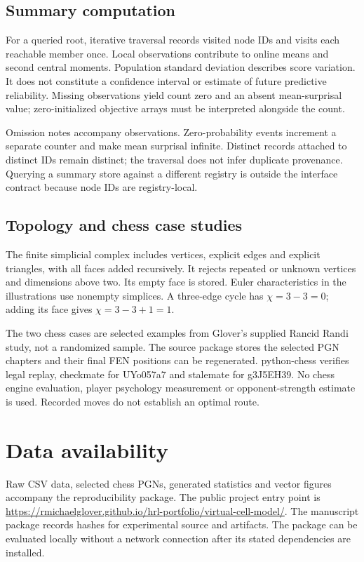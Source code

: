 \documentclass[10pt,a4paper]{article}
\begin{document}
\subsection*{Summary computation}
For a queried root, iterative traversal records visited node IDs and visits each reachable member once. Local observations contribute to online means and second central moments. Population standard deviation describes score variation. It does not constitute a confidence interval or estimate of future predictive reliability. Missing observations yield count zero and an absent mean-surprisal value; zero-initialized objective arrays must be interpreted alongside the count.

Omission notes accompany observations. Zero-probability events increment a separate counter and make mean surprisal infinite. Distinct records attached to distinct IDs remain distinct; the traversal does not infer duplicate provenance. Querying a summary store against a different registry is outside the interface contract because node IDs are registry-local.

\subsection*{Topology and chess case studies}
The finite simplicial complex includes vertices, explicit edges and explicit triangles, with all faces added recursively. It rejects repeated or unknown vertices and dimensions above two. Its empty face is stored. Euler characteristics in the illustrations use nonempty simplices. A three-edge cycle has $\chi=3-3=0$; adding its face gives $\chi=3-3+1=1$.

The two chess cases are selected examples from Glover's supplied Rancid Randi study, not a randomized sample. The source package stores the selected PGN chapters and their final FEN positions can be regenerated. python-chess verifies legal replay, checkmate for UYo057a7 and stalemate for g3J5EH39. No chess engine evaluation, player psychology measurement or opponent-strength estimate is used. Recorded moves do not establish an optimal route.

\section*{Data availability}
Raw CSV data, selected chess PGNs, generated statistics and vector figures accompany the reproducibility package. The public project entry point is \url{https://rmichaelglover.github.io/hrl-portfolio/virtual-cell-model/}. The manuscript package records hashes for experimental source and artifacts. The package can be evaluated locally without a network connection after its stated dependencies are installed.
\end{document}
